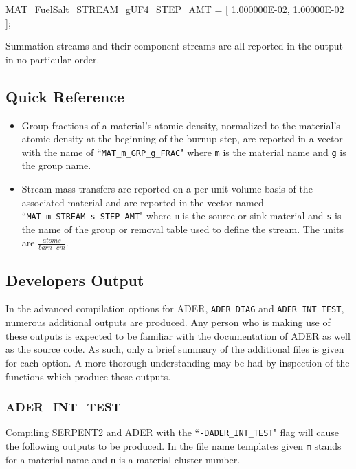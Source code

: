 \begin{li}
MAT_FuelSalt_STREAM_gUF4_STEP_AMT = [
1.000000E-02, 1.00000E-02 ];
\end{li} 

Summation streams and their component streams are all reported in the output
in no particular order.

\subsection{Quick Reference}\label{ssec:output_qr}
\begin{itemize}
\item{Group fractions of a material's atomic density, normalized to the
material's atomic density at the beginning of the burnup step, are reported in
a vector with the name of ``\texttt{MAT\_m\_GRP\_g\_FRAC}" where 
\texttt{m} is the material name and \texttt{g} is the group name.}
\item{Stream mass transfers are reported on a per unit volume basis of the
associated material and are reported in 
the vector named ``\texttt{MAT\_m\_STREAM\_s\_STEP\_AMT}" where \texttt{m}
is the source or sink material and \texttt{s} is the name of the group or 
removal table used to define the stream. The units are 
 $\frac{atoms}{barn \cdot cm}$. }
\end{itemize} 

\subsection{Developers Output}\label{ssec:output_dev}
In the advanced compilation options for ADER, \texttt{ADER\_DIAG} and 
\texttt{ADER\_INT\_TEST}, numerous additional outputs are produced. Any
person who is making use of these outputs is expected to be familiar with the
documentation of ADER as well as the source code. As such, only a brief summary
of the additional files is given for each option. A more thorough understanding
may be had by inspection of the functions which produce these outputs.

\subsubsection{ADER\_INT\_TEST}\label{ssec:output_dev_int}
Compiling SERPENT2 and ADER with the ``\texttt{-DADER\_INT\_TEST}" flag will
cause the following outputs to be produced. In the file name templates given
\texttt{m} stands for a material name and \texttt{n} is a material cluster 
number.

